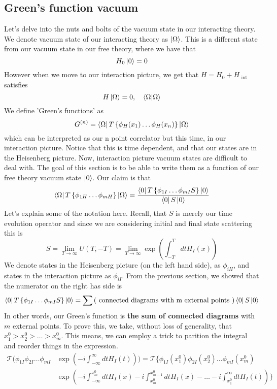 \subsection{Green's function vacuum} 
Let's delve into the 
nuts and bolts of the vacuum state in our interacting 
theory. We denote vacuum state of our interacting 
theory as $ \ket{ \Omega } $. This is a 
different state from our vacuum state in our free theory, 
where we have that 
\[
 H _ 0 \ket{ 0 } = 0 
\] However when we move to our interaction picture, 
we get that $ H = H_0 + H_{ \text{ int } } $ satisfies 
\[
	H \ket{ \Omega } = 0 , \quad \bra { \Omega } \ket { \Omega } 
\] We define 'Green's functions' as 
\[
	G ^{ ( n )  } =  \bra{ \Omega } T \left\{  \phi _ H ( x_ 1 ) \dots 
	\phi _ H ( x_ n ) \right\} \ket{ \Omega } 
\] which can be interpreted as our n point correlator 
but this time, in our interaction picture. Notice that 
this is time dependent, and that our states are in the Heisenberg 
picture.
Now, interaction picture vacuum states are difficult 
to deal with. The goal of this section is to be able to 
write them as a function of our free theory vacuum state 
$ \ket{ 0 } $.  
Our claim is that 
\[
	\bra{ \Omega } T \left\{  \phi_{ 1H  } \dots \phi _{ m H }  \right\} \ket{ \Omega } 
	= \frac{ \bra{ 0 } T \left\{  \phi_{ 1I  } \dots \phi_{ m I }  S \right\} \ket{ 0 }   }{ \bra{ 0 } S \ket{ 0 } }
\] Let's explain some of the notation here. Recall, that 
$ S $ is merely our time evolution operator and since 
we are considering initial and final state scattering this 
is 
\[
	S = \lim _{ T \to \infty } U ( T , -T ) = \lim _{ T \to \infty }
		\exp \left( \int _{ - T } ^ T  dt H _ I ( x )  \right)  
\] 
We denote states in the Heisenberg picture (on the left hand side), 
as $ \phi _{ i H } $, and states in the interaction 
picture as $ \phi _{ i I  }$. From the previous section, 
we showed that the numerator on the right has side is 
\[
  \bra{ 0 } T \left\{  \phi_{ 1I  } \dots \phi_{ m I }  S \right\} \ket{ 0 }  = 
  \sum \left(  \text{ connected diagrams with m external points } \right) 
  \bra{ 0 } S \ket{ 0 } 
\] 
In other words, our Green's function 
is \textbf{the sum of connected diagrams} with $ m $ external points. 
To prove this, we take, without loss of generality, 
that $ x_1 ^ 0 > x_2 ^ 0 > \dots > x_{ m } ^ 0 $. This means, 
we can employ a trick to parition the integral and reorder things in 
the expression. 
\begin{align*}
	\mathcal{T } \big (  \phi _{ 1I  } \phi _{ 2 I  } \dots \phi _{ m I }  & \exp 
	\left(   - i \int_{ - \infty } ^ \infty dt H _ I ( t)  \right) \big ) =  
	\mathcal{ T } \big \{ \phi _{ 1I  } ( x _ 1 ^ 0 ) \phi _{ 2 I  } ( x _ 2 ^ 0 ) \dots 
	\phi _{ m I  } ( x_ m ^ 0 ) \\ 
	 & \exp \left(  
- i \int_{ - \infty } ^{ x_ m ^ 0   } dt H _I ( x )  - i \int_{  x_ m ^ 0 } ^{ x _{ m - 1 } ^ 0  } 
dt H _ I ( x )  - \dots  -i \int _{ x_ 1 ^ 0  } ^{ \infty } dt H_ I ( t)  \right) \big \} 
\end{align*}
